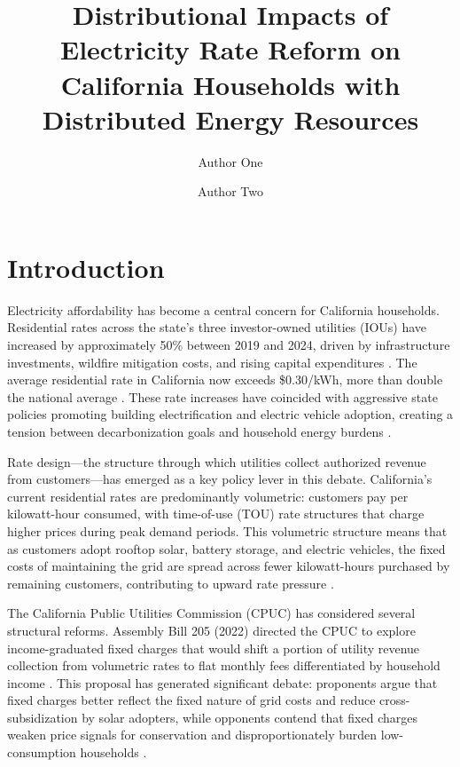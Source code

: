 \documentclass[9pt,twocolumn,twoside]{pnas-new}
\title{Distributional Impacts of Electricity Rate Reform on California Households with Distributed Energy Resources}
\author[a,1]{Author One}
\author[a]{Author Two}
\affil[a]{Department of Mechanical and Aerospace Engineering, University of California San Diego, La Jolla, CA 92093}
\begin{document}
\maketitle
\thispagestyle{firststyle}

\section*{Introduction}

Electricity affordability has become a central concern for California households. Residential rates across the state's three investor-owned utilities (IOUs) have increased by approximately 50\% between 2019 and 2024, driven by infrastructure investments, wildfire mitigation costs, and rising capital expenditures \cite{borenstein2022}. The average residential rate in California now exceeds \$0.30/kWh, more than double the national average \cite{eia2024}. These rate increases have coincided with aggressive state policies promoting building electrification and electric vehicle adoption, creating a tension between decarbonization goals and household energy burdens \cite{fowlie2021}.

Rate design---the structure through which utilities collect authorized revenue from customers---has emerged as a key policy lever in this debate. California's current residential rates are predominantly volumetric: customers pay per kilowatt-hour consumed, with time-of-use (TOU) rate structures that charge higher prices during peak demand periods. This volumetric structure means that as customers adopt rooftop solar, battery storage, and electric vehicles, the fixed costs of maintaining the grid are spread across fewer kilowatt-hours purchased by remaining customers, contributing to upward rate pressure \cite{borenstein2017}.

The California Public Utilities Commission (CPUC) has considered several structural reforms. Assembly Bill 205 (2022) directed the CPUC to explore income-graduated fixed charges that would shift a portion of utility revenue collection from volumetric rates to flat monthly fees differentiated by household income \cite{CPUC_D2405028}. This proposal has generated significant debate: proponents argue that fixed charges better reflect the fixed nature of grid costs and reduce cross-subsidization by solar adopters, while opponents contend that fixed charges weaken price signals for conservation and disproportionately burden low-consumption households \cite{borenstein2023}.
\end{document}
